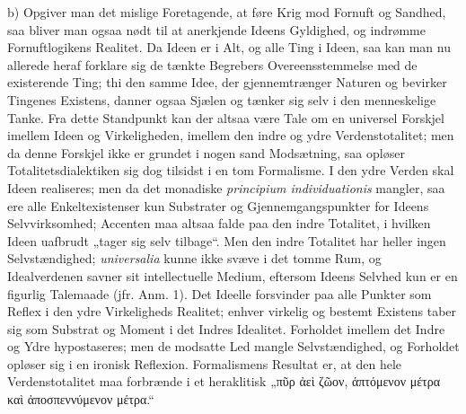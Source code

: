 \documentclass[12pt]{book}
\newcommand{\opage}[1]{\marginnote{\footnotesize\textit{[#1]}}}
\begin{document}
b) Opgiver man det mislige Foretagende, at føre Krig mod Fornuft og Sandhed, saa bliver
man ogsaa nødt til at anerkjende Ideens Gyldighed, og indrømme Fornuftlogikens Realitet.
Da Ideen er i Alt, og alle Ting i Ideen, saa kan man nu allerede heraf forklare sig de
tænkte Begrebers Overeensstemmelse med de existerende Ting; thi den samme Idee, der
gjennemtrænger Naturen og bevirker Tingenes Existens, danner ogsaa Sjælen og tænker sig
selv i den menneskelige Tanke. Fra dette Standpunkt kan der altsaa være Tale om en
universel Forskjel imellem Ideen og Virkeligheden, imellem den indre og ydre
Verdenstotalitet; men da denne Forskjel ikke er grundet i nogen sand Modsætning, saa
opløser Totalitetsdialektiken sig dog tilsidst i en tom Formalisme. I den ydre Verden skal
Ideen realiseres; men da det monadiske \textit{principium individuationis} mangler, saa
ere alle Enkeltexistenser kun Substrater og Gjennemgangspunkter for Ideens
Selvvirksomhed; Accenten maa altsaa falde paa den indre Totalitet, i hvilken Ideen
uafbrudt „tager sig selv tilbage“. Men den indre Totalitet har heller ingen
Selvstændighed; \textit{universalia} kunne ikke svæve i det tomme Rum, og Idealverdenen
savner sit intellectuelle Medium, eftersom Ideens Selvhed kun er en figurlig Talemaade
(jfr. Anm. 1). Det Ideelle forsvinder paa alle Punkter som Reflex i den ydre Virkeligheds
Realitet; enhver virkelig og bestemt Existens taber sig som Substrat og Moment i det
Indres Idealitet. Forholdet imellem det Indre og Ydre hypostaseres; men de modsatte Led
mangle Selvstændighed, og Forholdet opløser sig i en ironisk Reflexion. Formalismens
Resultat er, at den hele Verdenstotalitet maa forbrænde
\opage{197} %
%
i et heraklitisk „πῦρ ἀεὶ ζῶον, ἁπτόμενον μέτρα καὶ ἀποσπεννύμενον μέτρα.“
\end{document}
